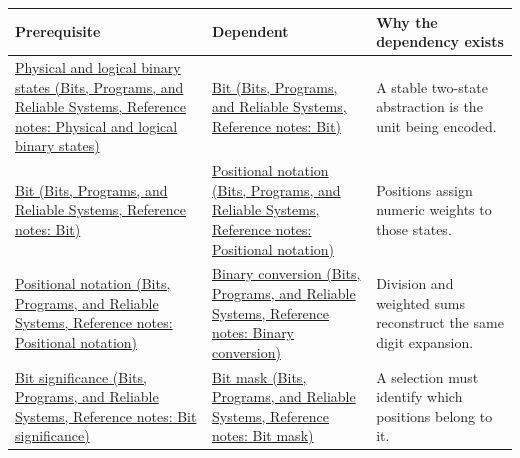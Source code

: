 {\def\LTcaptype{none} %
\begin{longtable}[]{@{}
  >{\raggedright\arraybackslash}p{}
  >{\raggedright\arraybackslash}p{}
  >{\raggedright\arraybackslash}p{}@{}}
\toprule\noalign{}
\begin{minipage}[b]{\linewidth}\raggedright
Prerequisite
\end{minipage} & \begin{minipage}[b]{\linewidth}\raggedright
Dependent
\end{minipage} & \begin{minipage}[b]{\linewidth}\raggedright
Why the dependency exists
\end{minipage} \\
\midrule\noalign{}
\endhead
\bottomrule\noalign{}
\endlastfoot
\href{../01-Bits-Programs-and-Reliable-Systems/main.pdf\#nameddest=appendix-ea798b1ceb35}{Physical and logical binary states (Bits, Programs, and Reliable Systems, Reference notes: Physical and logical binary states)} & \href{../01-Bits-Programs-and-Reliable-Systems/main.pdf\#nameddest=appendix-ddbb69998a2e}{Bit (Bits, Programs, and Reliable Systems, Reference notes: Bit)} & A stable two-state abstraction is the unit being encoded. \\
\href{../01-Bits-Programs-and-Reliable-Systems/main.pdf\#nameddest=appendix-ddbb69998a2e}{Bit (Bits, Programs, and Reliable Systems, Reference notes: Bit)} & \href{../01-Bits-Programs-and-Reliable-Systems/main.pdf\#nameddest=appendix-83c3f28f7bda}{Positional notation (Bits, Programs, and Reliable Systems, Reference notes: Positional notation)} & Positions assign numeric weights to those states. \\
\href{../01-Bits-Programs-and-Reliable-Systems/main.pdf\#nameddest=appendix-83c3f28f7bda}{Positional notation (Bits, Programs, and Reliable Systems, Reference notes: Positional notation)} & \href{../01-Bits-Programs-and-Reliable-Systems/main.pdf\#nameddest=appendix-dc552784a2c0}{Binary conversion (Bits, Programs, and Reliable Systems, Reference notes: Binary conversion)} & Division and weighted sums reconstruct the same digit expansion. \\
\href{../01-Bits-Programs-and-Reliable-Systems/main.pdf\#nameddest=appendix-280445746493}{Bit significance (Bits, Programs, and Reliable Systems, Reference notes: Bit significance)} & \href{../01-Bits-Programs-and-Reliable-Systems/main.pdf\#nameddest=appendix-dbe5905163c2}{Bit mask (Bits, Programs, and Reliable Systems, Reference notes: Bit mask)} & A selection must identify which positions belong to it. \\

\end{longtable}}
